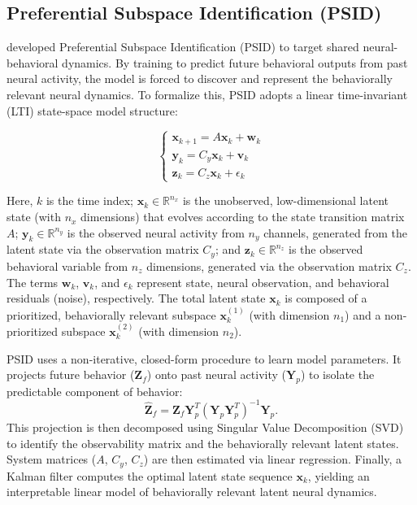 \documentclass[12pt, a4paper]{article}
\begin{document}
\subsection{Preferential Subspace Identification (PSID)}

\textcite{saniModelingBehaviorallyRelevant2021} developed Preferential Subspace Identification (PSID) to target shared neural-behavioral dynamics. By training to predict future behavioral outputs from past neural activity, the model is forced to discover and represent the behaviorally relevant neural dynamics. To formalize this, PSID adopts a linear time-invariant (LTI) state-space model structure:

$$
\begin{cases}
\mathbf{x}_{k+1} = A \mathbf{x}_k + \mathbf{w}_k \\
\mathbf{y}_k = C_y \mathbf{x}_k + \mathbf{v}_k \\
\mathbf{z}_k = C_z \mathbf{x}_k + \epsilon_k
\end{cases}
$$

Here, $k$ is the time index; $\mathbf{x}_k \in \mathbb{R}^{n_x}$ is the unobserved, low-dimensional latent state (with $n_x$ dimensions) that evolves according to the state transition matrix $A$; $\mathbf{y}_k \in \mathbb{R}^{n_y}$ is the observed neural activity from $n_y$ channels, generated from the latent state via the observation matrix $C_y$; and $\mathbf{z}_k \in \mathbb{R}^{n_z}$ is the observed behavioral variable from $n_z$ dimensions, generated via the observation matrix $C_z$. The terms $\mathbf{w}_k$, $\mathbf{v}_k$, and $\epsilon_k$ represent state, neural observation, and behavioral residuals (noise), respectively. The total latent state $\mathbf{x}_k$ is composed of a prioritized, behaviorally relevant subspace $\mathbf{x}_k^{(1)}$ (with dimension $n_1$) and a non-prioritized subspace $\mathbf{x}_k^{(2)}$ (with dimension $n_2$).

PSID uses a non-iterative, closed-form procedure to learn model parameters. It projects future behavior ($\mathbf{Z}_f$) onto past neural activity ($\mathbf{Y}_p$) to isolate the predictable component of behavior:
$$\hat{\mathbf{Z}}_f = \mathbf{Z}_f \mathbf{Y}_p^T (\mathbf{Y}_p \mathbf{Y}_p^T)^{-1} \mathbf{Y}_p.$$
This projection is then decomposed using Singular Value Decomposition (SVD) to identify the observability matrix and the behaviorally relevant latent states. System matrices ($A$, $C_y$, $C_z$) are then estimated via linear regression. Finally, a Kalman filter computes the optimal latent state sequence $\mathbf{x}_k$, yielding an interpretable linear model of behaviorally relevant latent neural dynamics.
\end{document}
